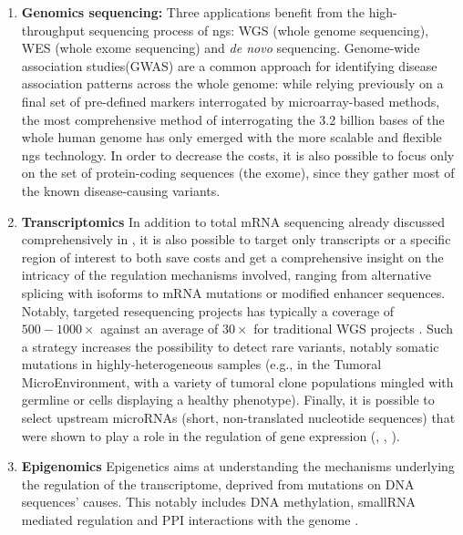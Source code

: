 \begin{enumerate}[label=(\roman*)]

\item \textbf{Genomics sequencing:} Three applications benefit from the high-throughput sequencing process of \acrshort{ngs}: WGS (whole genome sequencing), WES (whole exome sequencing) and \emph{de novo} sequencing. Genome-wide association studies(GWAS) are a common approach for identifying disease association patterns across the whole genome: while relying previously on a final set of pre-defined markers interrogated by microarray-based methods, the most comprehensive method of interrogating the 3.2 billion bases of the whole human genome has only emerged with the more scalable and flexible \acrshort{ngs} technology.  In order to decrease the costs, it is also possible to focus only on the set of protein-coding sequences (the exome), since they  gather most of the known disease-causing variants. 

\item \textbf{Transcriptomics} In addition to total mRNA sequencing already discussed comprehensively in , it is also possible to target only transcripts or a specific region of interest to both save costs and get a comprehensive insight on the intricacy of the regulation mechanisms involved, ranging from alternative splicing with isoforms to mRNA mutations or modified enhancer sequences. Notably, targeted resequencing projects has typically a coverage of $500-1000 \times$ against an average of $30\times$ for traditional WGS projects \autocite{li_etal15} \autocite{johansson_etal11}. Such a strategy increases the possibility to detect rare variants, notably somatic mutations in highly-heterogeneous samples (e.g., in the Tumoral MicroEnvironment, with a variety of tumoral clone populations mingled with germline or cells displaying a healthy phenotype).
Finally, it is possible to select upstream microRNAs (short, non-translated nucleotide sequences) that were shown to play a role in the regulation of gene expression (, \autocite{catalanotto_etal16}, \autocite{moreno-moya_etal14}).

\item \textbf{Epigenomics} Epigenetics aims at understanding the mechanisms underlying the regulation of the transcriptome, deprived from mutations on DNA sequences' causes. This notably includes DNA methylation, smallRNA mediated regulation and PPI interactions with the genome .


\end{enumerate}
